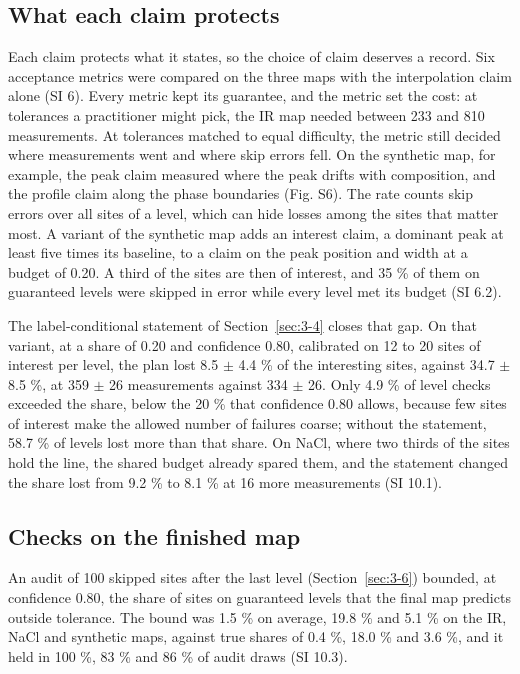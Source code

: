 \documentclass{iopjournal}
\begin{document}
\hypertarget{sec:5-5}{%
\subsection{What each claim protects}\label{sec:5-5}}

Each claim protects what it states, so the choice of claim deserves a record. Six acceptance metrics were compared on the three maps with the interpolation claim alone (SI 6). Every metric kept its guarantee, and the metric set the cost: at tolerances a practitioner might pick, the IR map needed between 233 and 810 measurements. At tolerances matched to equal difficulty, the metric still decided where measurements went and where skip errors fell. On the synthetic map, for example, the peak claim measured where the peak drifts with composition, and the profile claim along the phase boundaries (Fig. S6). The rate counts skip errors over all sites of a level, which can hide losses among the sites that matter most. A variant of the synthetic map adds an interest claim, a dominant peak at least five times its baseline, to a claim on the peak position and width at a budget of 0.20. A third of the sites are then of interest, and 35 \% of them on guaranteed levels were skipped in error while every level met its budget (SI 6.2).

The label-conditional statement of Section~\ref{sec:3-4} closes that gap. On that variant, at a share of 0.20 and confidence 0.80, calibrated on 12 to 20 sites of interest per level, the plan lost 8.5 \ensuremath{\pm} 4.4 \% of the interesting sites, against 34.7 \ensuremath{\pm} 8.5 \%, at 359 \ensuremath{\pm} 26 measurements against 334 \ensuremath{\pm} 26. Only 4.9 \% of level checks exceeded the share, below the 20 \% that confidence 0.80 allows, because few sites of interest make the allowed number of failures coarse; without the statement, 58.7 \% of levels lost more than that share. On NaCl, where two thirds of the sites hold the line, the shared budget already spared them, and the statement changed the share lost from 9.2 \% to 8.1 \% at 16 more measurements (SI 10.1).

\hypertarget{sec:5-6}{%
\subsection{Checks on the finished map}\label{sec:5-6}}

An audit of 100 skipped sites after the last level (Section~\ref{sec:3-6}) bounded, at confidence 0.80, the share of sites on guaranteed levels that the final map predicts outside tolerance. The bound was 1.5 \% on average, 19.8 \% and 5.1 \% on the IR, NaCl and synthetic maps, against true shares of 0.4 \%, 18.0 \% and 3.6 \%, and it held in 100 \%, 83 \% and 86 \% of audit draws (SI 10.3).
\end{document}

